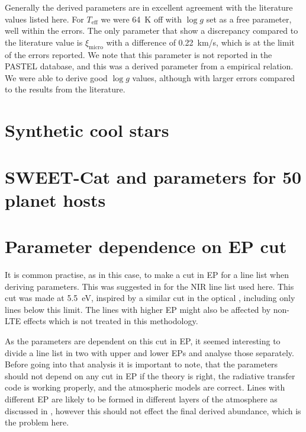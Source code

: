 Generally the derived parameters are in excellent agreement with the literature values listed here.
For $T_\mathrm{eff}$ we were \SI{64}{K} off with $\log g$ set as a free parameter, well within the
errors. The only parameter that show a discrepancy compared to the literature value is
$\xi_\mathrm{micro}$ with a difference of \SI{0.22}{km/s}, which is at the limit of the errors
reported. We note that this parameter is not reported in the PASTEL database, and this was a derived
parameter from a empirical relation. We were able to derive good $\log g$ values, although with
larger errors compared to the results from the literature.


\section{Synthetic cool stars}
\label{sec:synthetic_spectra}



\section{SWEET-Cat and parameters for 50 planet hosts}
\label{sec:SWEET-Cat}




\section{Parameter dependence on EP cut}
\label{sec:EPcut}

It is common practise, as in this case, to make a cut in EP for a line list when deriving
parameters. This was suggested in \citet{Andreasen2016} \citep[later done in][]{Andreasen2017b} for
the NIR line list used here. This cut was made at \SI{5.5}{eV}, inspired by a similar cut in the
optical \citep{Sousa2008a}, including only lines below this limit. The lines with higher EP might
also be affected by non-LTE effects which is not treated in this methodology.

As the parameters are dependent on this cut in EP, it
seemed interesting to divide a line list in two with upper and lower EPs and analyse those
separately. Before going into that analysis it is important to note, that the parameters should not
depend on any cut in EP if the theory is right, the radiative transfer code is working properly, and
the atmospheric models are correct. Lines with different EP are likely to be formed in different
layers of the atmosphere as discussed in , however this should not
effect the final derived abundance, which is the problem here.
